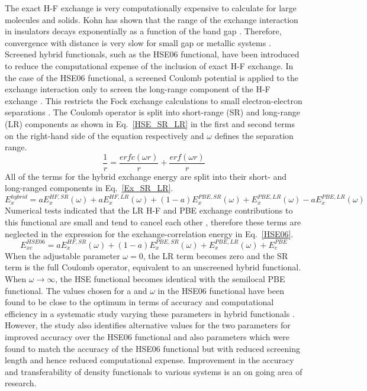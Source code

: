 \documentclass[11pt, twoside]{report}
\begin{document}
The exact H-F exchange is very computationally expensive to calculate for large molecules and solids. Kohn has shown that the range of the exchange interaction in insulators decays exponentially as a function of the band gap \cite{HSE_ref13}. Therefore, convergence with distance is very slow for small gap or metallic systems \cite{HSE}.
Screened hybrid functionals, such as the HSE06 functional, have been introduced to reduce the computational expense of the inclusion of exact H-F exchange. In the case of the HSE06 functional, a screened Coulomb potential is applied to the exchange interaction only to screen the long-range component of the H-F exchange \cite{HSE2}. This restricts the Fock exchange calculations to small electron-electron separations \cite{HSE_systematic}. The Coulomb operator is split into short-range (SR) and long-range (LR) components as shown in Eq.~\ref{HSE_SR_LR} in the first and second terms on the right-hand side of the equation respectively and $\omega$ defines the separation range.
\begin{equation}\label{HSE_SR_LR}
\frac{1}{r} = \frac{erfc(\omega r)}{r} + \frac{erf(\omega r)}{r}
\end{equation}
All of the terms for the hybrid exchange energy are split into their short- and long-ranged components in Eq.~\ref{Ex_SR_LR}.
\begin{equation}\label{Ex_SR_LR}
E_x^{hybrid} = aE_x^{HF,SR}(\omega) + aE_x^{HF,LR}(\omega) + (1-a)E_x^{PBE,SR}(\omega) + E_x^{PBE,LR}(\omega) - aE_x^{PBE,LR}(\omega)
\end{equation}
Numerical tests indicated that the LR H-F and PBE exchange contributions to this functional are small and tend to cancel each other \cite{HSE}, therefore these terms are neglected in the expression for the exchange-correlation energy in Eq.~\ref{HSE06}.
\begin{equation}\label{HSE06}
E_{xc}^{HSE06} = aE_x^{HF,SR}(\omega) + (1-a)E_x^{PBE,SR}(\omega) + E_x^{PBE,LR}(\omega) + E_c^{PBE}
\end{equation}
When the adjustable parameter $\omega = 0$, the LR term becomes zero and the SR term is the full Coulomb operator, equivalent to an unscreened hybrid functional. When $\omega \rightarrow \infty $, the HSE functional becomes identical with the semilocal PBE functional. The values chosen for a and $\omega$ in the HSE06 functional have been found to be close to the optimum in terms of accuracy and computational efficiency in a systematic study varying these parameters in hybrid functionals \cite{HSE_systematic}. However, the study also identifies alternative values for the two parameters for improved accuracy over the HSE06 functional and also parameters which were found to match the accuracy of the HSE06 functional but with reduced screening length and hence reduced computational expense. Improvement in the accuracy and transferability of density functionals to various systems is an on going area of research.
\end{document}
